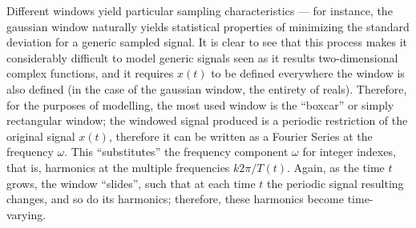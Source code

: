	Different windows yield particular sampling characteristics — for instance, the gaussian window naturally yields statistical properties of minimizing the standard deviation for a generic sampled signal. It is clear to see that this process makes it considerably difficult to model generic signals seen as it results two-dimensional complex functions, and it requires $x(t)$ to be defined everywhere the window is also defined (in the case of the gaussian window, the entirety of reals). Therefore, for the purposes of modelling, the most used window is the ``boxcar'' or simply rectangular window; the windowed signal produced is a periodic restriction of the original signal $x(t)$, therefore it can be written as a Fourier Series at the frequency $\omega$. This ``substitutes'' the frequency component $\omega$ for integer indexes, that is, harmonics at the multiple frequencies $k 2\pi/T(t)$. Again, as the time $t$ grows, the window ``slides'', such that at each time $t$ the periodic signal resulting changes, and so do its harmonics; therefore, these harmonics become time-varying.

